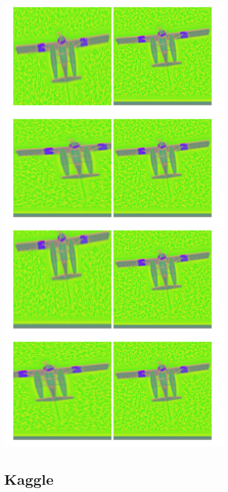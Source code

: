 \documentclass{article}
\begin{document}
\begin{centering}
\includegraphics[scale=0.5]{images/ImageDistortion.png}
\end{centering}

\section{Kaggle}
\end{document}
